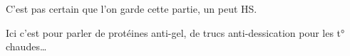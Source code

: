 \begin{note}

C’est pas certain que l’on garde cette partie, un peut HS.

Ici c’est pour parler de protéines anti-gel, de trucs anti-dessication pour les t° chaudes\ldots

\end{note} %